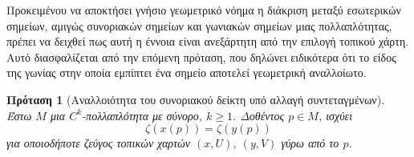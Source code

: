 \documentclass[11pt,a4paper,twoside,openright]{book}
\newtheorem{proposition}[lemma]{Πρόταση}
\begin{document}
\noindent
Προκειμένου να αποκτήσει γνήσιο γεωμετρικό νόημα η διάκριση μεταξύ εσωτερικών σημείων, αμιγώς συνοριακών σημείων και γωνιακών σημείων μιας πολλαπλότητας, πρέπει να δειχθεί πως αυτή η έννοια είναι ανεξάρτητη από την επιλογή τοπικού χάρτη. Αυτό διασφαλίζεται από την επόμενη πρόταση, που δηλώνει ειδικότερα ότι το είδος της γωνίας στην οποία εμπίπτει ένα σημείο αποτελεί γεωμετρική αναλλοίωτο.
\begin{proposition}[Αναλλοιότητα του συνοριακού δείκτη υπό αλλαγή συντεταγμένων]\label{prop:invariance-boundary-index}
Έστω $M$ μια $C^k$-πολλαπλότητα με σύνορο, $k \ge 1$. Δοθέντος $p \in M$, ισχύει
\begin{equation*}\label{eq:invariance-boundary-index}
\zeta(x(p)) = \zeta(y(p))
\end{equation*}
για οποιοδήποτε ζεύγος τοπικών χαρτών $(x, U)$, $(y, V)$ γύρω από το $p$.
\end{proposition}
\end{document}
